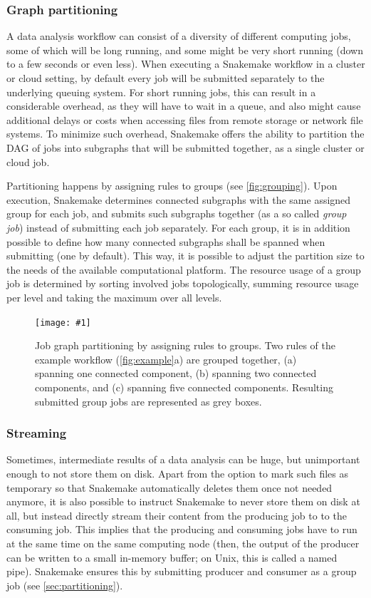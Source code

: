\documentclass[parskip=half]{scrartcl}
\newcommand{\image}[1]{\centering\texttt{[image: \#1]}}
\begin{document}
\subsubsection{Graph partitioning}\label{sec:partitioning}

A data analysis workflow can consist of a diversity of different computing jobs, some of which will be long running, and some might be very short running (down to a few seconds or even less).
When executing a Snakemake workflow in a cluster or cloud setting, by default every job will be submitted separately to the underlying queuing system.
For short running jobs, this can result in a considerable overhead, as they will have to wait in a queue, and also might cause additional delays or costs when accessing files from remote storage or network file systems.
To minimize such overhead, Snakemake offers the ability to partition the DAG of jobs into subgraphs that will be submitted together, as a single cluster or cloud job.

Partitioning happens by assigning rules to groups (see \autoref{fig:grouping}).
Upon execution, Snakemake determines connected subgraphs with the same assigned group for each job, and submits such subgraphs together (as a so called \emph{group job}) instead of submitting each job separately.
For each group, it is in addition possible to define how many connected subgraphs shall be spanned when submitting (one by default).
This way, it is possible to adjust the partition size to the needs of the available computational platform.
The resource usage of a group job is determined by sorting involved jobs topologically, summing resource usage per level and taking the maximum over all levels.

\begin{figure}
	\image{group-jobs.pdf}
	\caption{Job graph partitioning by assigning rules to groups.
		Two rules of the example workflow (\autoref{fig:example}a) are grouped together, (a) spanning one connected component, (b) spanning two connected components, and (c) spanning five connected components.
		Resulting submitted group jobs are represented as grey boxes.
	}\label{fig:grouping}
\end{figure}

\subsubsection{Streaming}\label{sec:streaming}

Sometimes, intermediate results of a data analysis can be huge, but unimportant enough to not store them on disk.
Apart from the option to mark such files as temporary so that Snakemake automatically deletes them once not needed anymore, it is also possible to instruct Snakemake to never store them on disk at all, but instead directly stream their content from the producing job to to the consuming job.
This implies that the producing and consuming jobs have to run at the same time on the same computing node (then, the output of the producer can be written to a small in-memory buffer; on Unix, this is called a named pipe).
Snakemake ensures this by submitting producer and consumer as a group job (see \autoref{sec:partitioning}).
\end{document}
